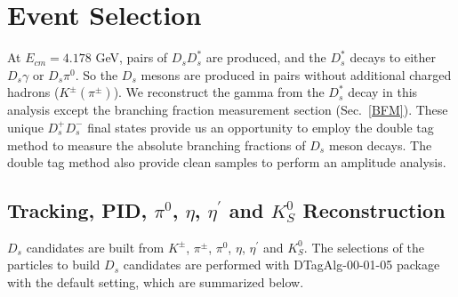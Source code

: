 \section{Event Selection}
\label{ST-selection}
At $E_{cm} = 4.178$ GeV, pairs of $D_{s}D_{s}^{*}$ are produced,  and the $D_{s}^{*}$ decays to either $D_{s}\gamma$ or $D_{s}\pi^{0}$.
So the $D_{s}$ mesons are produced in pairs without additional charged hadrons ($K^{\pm}(\pi^{\pm})$).
We reconstruct the gamma from the $D_{s}^{*}$ decay in this analysis except the branching fraction measurement section (Sec.~\ref{BFM}). 
These unique $D_{s}^{+}D_{s}^{-}$ final states provide us an opportunity to employ the double tag method to measure the absolute branching fractions of $D_{s}$ meson decays.
The double tag method also provide clean samples to perform an amplitude analysis.


\subsection{Tracking, PID, $\pi^{0}$, $\eta$, $\eta^{'}$ and $K_{S}^{0}$ Reconstruction }
$D_{s}$ candidates are built from $K^{\pm}$, $\pi^{\pm}$, $\pi^{0}$, $\eta$, $\eta^{'}$ and $K_{S}^{0}$. The selections of the particles to build $D_{s}$ candidates are performed with DTagAlg-00-01-05 package with the default setting, which are summarized below.

